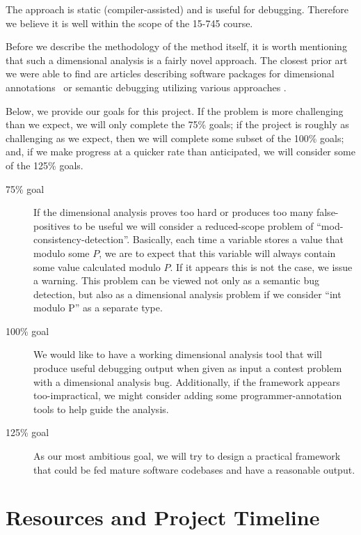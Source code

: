 \documentclass[12pt]{article}
\begin{document}
The approach is static (compiler-assisted) and is useful for debugging. Therefore we believe it is well within the scope of the 15-745 course.

Before we describe the methodology of the method itself, it is worth mentioning that such a dimensional analysis is a fairly novel approach. The closest prior art we were able to find are articles describing software packages for dimensional annotations~\cite{hilfinger1988ada} or semantic debugging utilizing various approaches \cite{bourdoncle1993, hall1991algorithmic, choi1989}.

Below, we provide our goals for this project. If the problem is more challenging than we expect, we will only complete the 75\% goals; if the project is roughly as challenging as we expect, then we will complete some subset of the 100\% goals; and, if we make progress at a quicker rate than anticipated, we will consider some of the 125\% goals.
\begin{description}
\item [75\% goal] If the dimensional analysis proves too hard or produces too many false-positives to be useful we will consider a reduced-scope problem of ``mod-consistency-detection''. Basically, each time a variable stores a value that modulo some $P$, we are to expect that this variable will always contain some value calculated modulo $P$. If it appears this is not the case, we issue a warning. This problem can be viewed not only as a semantic bug detection, but also as a dimensional analysis problem if we consider ``int modulo P'' as a separate type.

\item [100\% goal] We would like to have a working dimensional analysis tool that will produce useful debugging output when given as input a contest problem with a dimensional analysis bug. Additionally, if the framework appears too-impractical, we might consider adding some programmer-annotation tools to help guide the analysis. 

\item [125\% goal] As our most ambitious goal, we will try to design a practical framework that could be fed mature software codebases and have a reasonable output.
\end{description}

\section{Resources and Project Timeline}
\end{document}
